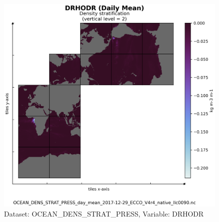 \begin{figure}[H]
\centering
\includegraphics[scale=0.55]{../images/plots/v4r4/native_plots/Ocean_Density_Stratification_and_Hydrostatic_Pressure/DRHODR.png}
\caption{Dataset: OCEAN\_DENS\_STRAT\_PRESS, Variable: DRHODR}
\label{tab:table-OCEAN_DENS_STRAT_PRESS_DRHODR-Plot}
\end{figure}
\newpage
\pagebreak
